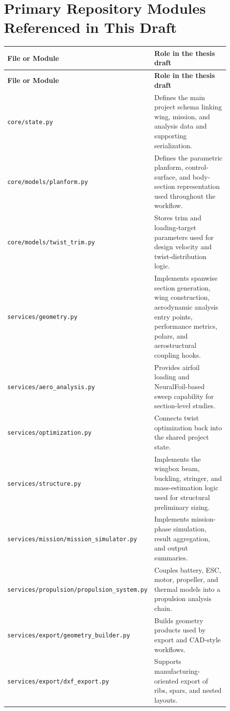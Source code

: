 \documentclass[12pt]{report}
\begin{document}
\chapter{Primary Repository Modules Referenced in This Draft}
\begingroup
\small
\setlength{\tabcolsep}{5pt}
\renewcommand{\arraystretch}{1.2}
\begin{longtable}{p{0.28\linewidth} p{0.62\linewidth}}
\toprule
\textbf{File or Module} & \textbf{Role in the thesis draft} \\
\midrule
\endfirsthead
\toprule
\textbf{File or Module} & \textbf{Role in the thesis draft} \\
\midrule
\endhead
\bottomrule
\endfoot
\texttt{core/state.py} & Defines the main project schema linking wing, mission, and analysis data and supporting serialization. \\
\texttt{core/models/planform.py} & Defines the parametric planform, control-surface, and body-section representation used throughout the workflow. \\
\texttt{core/models/twist\_trim.py} & Stores trim and loading-target parameters used for design velocity and twist-distribution logic. \\
\texttt{services/geometry.py} & Implements spanwise section generation, wing construction, aerodynamic analysis entry points, performance metrics, polars, and aerostructural coupling hooks. \\
\texttt{services/aero\_analysis.py} & Provides airfoil loading and NeuralFoil-based sweep capability for section-level studies. \\
\texttt{services/optimization.py} & Connects twist optimization back into the shared project state. \\
\texttt{services/structure.py} & Implements the wingbox beam, buckling, stringer, and mass-estimation logic used for structural preliminary sizing. \\
\texttt{services/mission/mission\_simulator.py} & Implements mission-phase simulation, result aggregation, and output summaries. \\
\texttt{services/propulsion/propulsion\_system.py} & Couples battery, ESC, motor, propeller, and thermal models into a propulsion analysis chain. \\
\texttt{services/export/geometry\_builder.py} & Builds geometry products used by export and CAD-style workflows. \\
\texttt{services/export/dxf\_export.py} & Supports manufacturing-oriented export of ribs, spars, and nested layouts. \\

\end{longtable}
\end{document}
